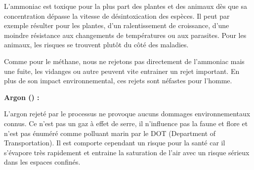 \documentclass[a4paper, oneside, 12pt]{article}
\begin{document}
L’ammoniac est toxique pour la plus part des plantes et des animaux dès que sa concentration dépasse la vitesse de désintoxication des espèces. Il peut par exemple résulter pour les plantes, d’un ralentissement de croissance, d’une moindre résistance aux changements de températures ou aux parasites. Pour les animaux, les risques se trouvent plutôt du côté des maladies. 

Comme pour le méthane, nous ne rejetons pas directement de l’ammoniac mais une fuite, les vidanges ou autre peuvent vite entrainer un rejet important. En plus de son impact environnemental, ces rejets sont néfastes pour l’homme.  \newline

\textbf{Argon () : }

L’argon rejeté par le processus ne provoque aucuns dommages environnementaux connus. Ce n’est pas un gaz à effet de serre, il n’influence pas la faune et flore et n’est pas énuméré comme polluant marin par le DOT (Department of Transportation). Il est comporte cependant un risque pour la santé car il s’évapore très rapidement et entraine la saturation de l’air avec un risque sérieux dans les espaces confinés. \newline
\end{document}
